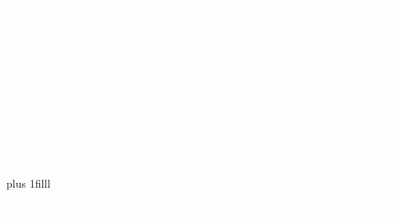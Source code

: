 \documentclass[t]{beamer}
\begin{document}
{
\begin{frame}[b]{\textcolor{white}{The continental shelf represents about 7–8\% of the ocean surface area.}}
\tiny\textcolor{white}{Seafloor Topography V4.0, \textcopyright\,W.H.F. Smith \& D.T. Sandwell, 1996.}
\end{frame}
}

{
\begin{frame}[b]{}
\tiny\textcolor{white}{U.S. Geological Survey Pacific Sea-Floor Mapping Project.}
\end{frame}
}

{
\begin{frame}[b]{}
\tiny\hfill\textcolor{white}{Puerto Rico Trench, U.S. Geological Survey Project PROBE Leg II.}
\end{frame}
}

{
\begin{frame}[b]{}

\tiny\textcolor{white}{Made with Google Earth, \textcopyright\,2015 Google Inc.}
\end{frame}
}

{
\begin{frame}[t]{}

\vspace*{4\baselineskip}

\hangpara\hspace*{17em}\parbox[t]{1.5in}{\raggedright\textcolor{white}{Why is the shelf broad on the east coast and narrow on the west coast?}}

\vspace*{1\baselineskip}

\hangpara\hspace*{17em}\parbox[t]{1.5in}{\raggedright\textcolor{white}{Will this difference affect marine life? If so, how? If not, why not?}}

\vskip0pt plus 1filll

\tiny\textcolor{white}{Made with Google Earth, \textcopyright\,2015 Google Inc.}
\end{frame}
}
\end{document}
